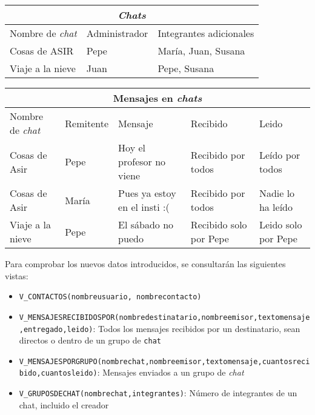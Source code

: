 \begin{homeworkProblem}
  \begin{tabular}{|l|l|l|}
    \hline
    \multicolumn{3}{|c|}{\textit{Chats}} \\
    \hline
    Nombre de \textit{chat} & Administrador & Integrantes adicionales \\
    \hline
    Cosas de ASIR & Pepe & María, Juan, Susana \\
    Viaje a la nieve & Juan & Pepe, Susana \\
    \hline
  \end{tabular}

  
  \begin{tabular}{|l|l|l|l|l|}
    \hline
    \multicolumn{5}{|c|}{Mensajes en \textit{chats}} \\
    \hline
    Nombre de \textit{chat} & Remitente & Mensaje & Recibido & Leido \\
    \hline
    Cosas de Asir & Pepe & Hoy el profesor no viene & Recibido por todos & Leído por todos \\
    Cosas de Asir & María & Pues ya estoy en el insti :( & Recibido por todos & Nadie lo ha leído \\
    Viaje a la nieve & Pepe & El sábado no puedo & Recibido solo por Pepe & Leido solo por Pepe \\
    \hline
  \end{tabular}
  

  

  Para comprobar los nuevos datos introducidos, se consultarán las siguientes vistas:
  
  \begin{itemize}
  \item \texttt{V\_CONTACTOS(nombreusuario, nombrecontacto)}
  
  \item \texttt{V\_MENSAJESRECIBIDOSPOR(nombredestinatario,nombreemisor,textomensaje,entregado,leido)}: Todos los mensajes recibidos por un destinatario, sean directos o dentro de un grupo de \texttt{chat}
  \item \texttt{V\_MENSAJESPORGRUPO(nombrechat,nombreemisor,textomensaje,cuantosrecibido,cuantosleido)}: Mensajes enviados a un grupo de \textit{chat}
    
  \item \texttt{V\_GRUPOSDECHAT(nombrechat,integrantes)}: Número de integrantes de un chat, incluido el creador
\end{itemize}

\end{homeworkProblem}

